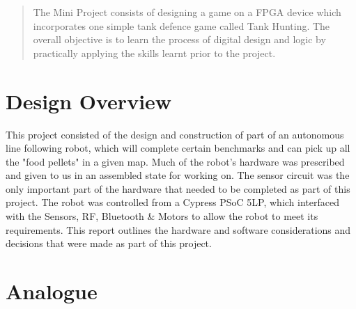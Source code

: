 \documentclass{article}
\begin{document}
\newpage

\maketitle


\begin{abstract}

The Mini Project consists of designing a game on a FPGA device which incorporates one simple tank defence game called Tank Hunting. The overall objective is to learn the process of digital design and logic by practically applying the skills learnt prior to the project.

\end{abstract}


\section{Design Overview}

This project consisted of the design and construction of part of an autonomous line following robot, which will complete certain benchmarks and can pick up all the "food pellets" in a given map. Much of the robot's hardware was prescribed and given to us in an assembled state for working on. The sensor circuit was the only important part of the hardware that needed to be completed as part of this project. The robot was controlled from a Cypress PSoC 5LP, which interfaced with the Sensors, RF, Bluetooth \&  Motors to allow the robot to meet its requirements. This report outlines the hardware and software considerations and decisions that were made as part of this project.


\section{Analogue}
\end{document}
